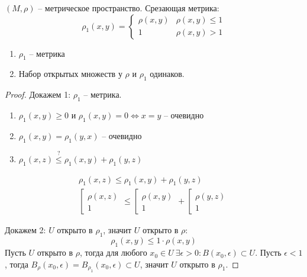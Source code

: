 \documentclass[main]{subfiles}
\begin{document}
\begin{theorem}
    $(M, \rho)$ -- метрическое пространство. Срезающая метрика:
    \[\rho_1 (x, y) = \begin{cases}
            \rho(x,y) & \rho(x,y) \le 1 \\
            1         & \rho(x,y) >1
        \end{cases}\]
    \begin{enumerate}
        \item $\rho_1$ -- метрика
        \item Набор открытых множеств у $\rho$ и $\rho_1$ одинаков.
    \end{enumerate}
\end{theorem}
\begin{proof}
    Докажем 1: $\rho_1$ -- метрика.
    \begin{enumerate}
        \item $\rho_1 (x,y) \ge 0$ и $\rho_1 (x,y) = 0 \Leftrightarrow x = y$ -- очевидно
        \item $\rho_1(x,y) = \rho_1(y,x)$ -- очевидно
        \item $\rho_1 (x,z) \overset{?}{\le} \rho_1 (x,y) + \rho_1 (y,z)$
    \end{enumerate}
    \begin{gather*}
        \rho_1 (x,z) \le \rho_1 (x,y) + \rho_1 (y,z)\\
        \left[
        \begin{array}{l}
            \rho(x,z) \\
            1
        \end{array}
        \right. \le
        \left[
        \begin{array}{l}
            \rho(x,y) \\
            1
        \end{array}
        \right. +
        \left[
        \begin{array}{l}
            \rho(y,z) \\
            1
        \end{array}
        \right.
    \end{gather*}

    Докажем 2: $U$ открыто в $\rho_1$, значит $U$ открыто в $\rho$:
    \[\rho_1 (x,y) \le 1 \cdot \rho(x,y)\]
    Пусть $U$ открыто в $\rho$, тогда для любого $x_0 \in U\ \exists \epsilon > 0: B(x_0, \epsilon) \subset U$.
    Пусть $\epsilon < 1$, тогда $B_\rho (x_0, \epsilon) = B_{\rho_1} (x_0, \epsilon) \subset U$, значит $U$ открыто в $\rho_1$.
\end{proof}
\end{document}
